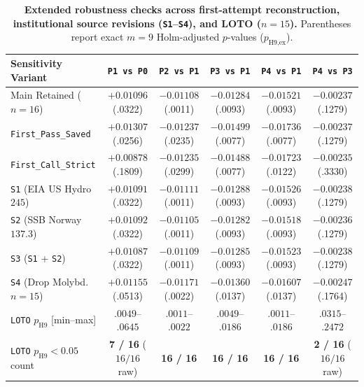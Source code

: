\documentclass[11pt,letterpaper]{article}
\theoremstyle{plain}
\begin{document}
\begin{table}[t]
\centering
\caption{\textbf{Extended robustness checks across first-attempt reconstruction, institutional source revisions (\texttt{S1}--\texttt{S4}), and LOTO ($n=15$).} Parentheses report exact $m=9$ Holm-adjusted $p$-values ($p_{\text{H9,ex}}$).}
\label{tab:robustness-ext}
\scriptsize
\setlength{\tabcolsep}{2.4pt}
\begin{tabular}{@{}l c c c c c@{}}
\toprule
\textbf{Sensitivity Variant} & \textbf{\texttt{P1 vs P0}} & \textbf{\texttt{P2 vs P1}} & \textbf{\texttt{P3 vs P1}} & \textbf{\texttt{P4 vs P1}} & \textbf{\texttt{P4 vs P3}} \\
\midrule
Main Retained ($n=16$) & $+0.01096$ ({\tiny .0322}) & $-0.01108$ ({\tiny .0011}) & $-0.01284$ ({\tiny .0093}) & $-0.01521$ ({\tiny .0093}) & $-0.00237$ ({\tiny .1279}) \\
\texttt{First\_Pass\_Saved} & $+0.01307$ ({\tiny .0256}) & $-0.01237$ ({\tiny .0235}) & $-0.01499$ ({\tiny .0077}) & $-0.01736$ ({\tiny .0077}) & $-0.00237$ ({\tiny .1279}) \\
\texttt{First\_Call\_Strict} & $+0.00878$ ({\tiny .1809}) & $-0.01235$ ({\tiny .0299}) & $-0.01488$ ({\tiny .0077}) & $-0.01723$ ({\tiny .0122}) & $-0.00235$ ({\tiny .3330}) \\
\texttt{S1} (EIA US Hydro $245$) & $+0.01091$ ({\tiny .0322}) & $-0.01111$ ({\tiny .0011}) & $-0.01288$ ({\tiny .0093}) & $-0.01526$ ({\tiny .0093}) & $-0.00238$ ({\tiny .1279}) \\
\texttt{S2} (SSB Norway $137.3$) & $+0.01092$ ({\tiny .0322}) & $-0.01105$ ({\tiny .0011}) & $-0.01282$ ({\tiny .0093}) & $-0.01518$ ({\tiny .0093}) & $-0.00236$ ({\tiny .1279}) \\
\texttt{S3} (\texttt{S1} + \texttt{S2}) & $+0.01087$ ({\tiny .0322}) & $-0.01109$ ({\tiny .0011}) & $-0.01285$ ({\tiny .0093}) & $-0.01523$ ({\tiny .0093}) & $-0.00238$ ({\tiny .1279}) \\
\texttt{S4} (Drop Molybd.\ $n=15$) & $+0.01155$ ({\tiny .0513}) & $-0.01171$ ({\tiny .0022}) & $-0.01360$ ({\tiny .0137}) & $-0.01607$ ({\tiny .0137}) & $-0.00247$ ({\tiny .1764}) \\
\texttt{LOTO} $p_{\text{H9}}$ [min--max] & $.0049$--$.0645$ & $.0011$--$.0022$ & $.0049$--$.0186$ & $.0011$--$.0186$ & $.0315$--$.2472$ \\
\texttt{LOTO} $p_{\text{H9}}<0.05$ count & \textbf{7 / 16} ($16/16$ raw) & \textbf{16 / 16} & \textbf{16 / 16} & \textbf{16 / 16} & \textbf{2 / 16} ($16/16$ raw) \\
\bottomrule
\end{tabular}
\end{table}
\end{document}
